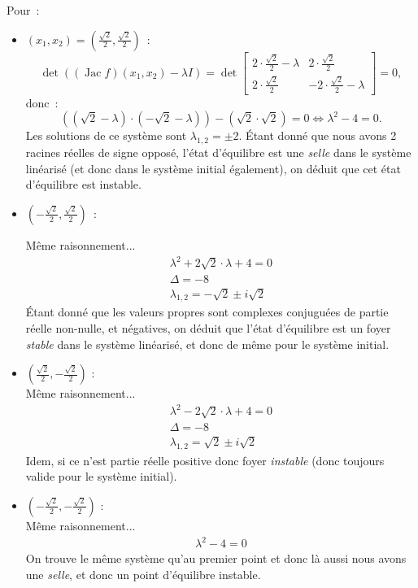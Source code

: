 \documentclass[11pt,a4paper]{report}
\newcommand{\rac}{\ensuremath{\frac{\sqrt{2}}{2}}}
\DeclareMathOperator{\Jac}{Jac}
\begin{document}
			Pour~:
			\begin{itemize}
				\item $(x_1, x_2) = \left(\rac , \rac\right)$~:
					\[\det\left((\Jac f)(x_1, x_2) - \lambda I\right) = \det
					\begin{bmatrix}
			   		2 \cdot \rac - \lambda & 2\cdot \rac \\
			   		2\cdot \rac & -2\cdot \rac  - \lambda
					\end{bmatrix}= 0,
					\]
					donc~:
					\[
						((\sqrt{2} - \lambda) \cdot (- \sqrt{2} - \lambda)) - (\sqrt{2} \cdot \sqrt{2}) = 0 \Leftrightarrow \lambda^2 - 4 = 0.
					\]
					Les solutions de ce système sont $\lambda_{1,2} = \pm 2$. Étant donné que nous avons 2 racines réelles de signe opposé, l'état d'équilibre est une \emph{selle} dans le système
					linéarisé (et donc dans le système initial également), on déduit que cet état d'équilibre est instable.

				\item $(-\rac , \rac)$~:

					Même raisonnement...
					\begin{gather*}
						\lambda^2 + 2\sqrt{2}\cdot\lambda+4 = 0	\\
						\Delta = -8 \\
						\lambda_{1,2} = -\sqrt{2} \pm i\sqrt{2}
					\end{gather*}
					Étant donné que les valeurs propres sont complexes conjuguées de partie réelle non-nulle, et négatives, on déduit que l'état d'équilibre est un foyer \textit{stable} dans le système
					linéarisé, et donc de même pour le système initial.

				\item $(\rac , -\rac)$ : \\
					Même raisonnement...
					\begin{gather*}
						\lambda^2 - 2\sqrt{2}\cdot\lambda+4 = 0	\\
						\Delta = -8 \\
						\lambda_{1,2} = \sqrt{2} \pm i\sqrt{2}
					\end{gather*}
					Idem, si ce n'est partie réelle positive donc foyer \textit{instable} (donc toujours valide pour le système initial).

				\item $( -\rac , -\rac)$ : \\
					Même raisonnement...
					\begin{gather*}
						\lambda^2 - 4 = 0
					\end{gather*}
					On trouve le même système qu'au premier point et donc là aussi nous avons une \emph{selle}, et donc un point d'équilibre instable.
			\end{itemize}
\end{document}

